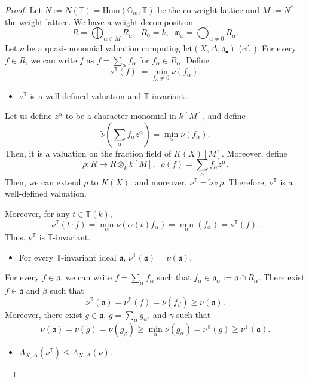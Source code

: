 \documentclass[a4paper,12pt]{amsart}
\theoremstyle{definition} %
\theoremstyle{remark}
\numberwithin{equation}{section}
\begin{document}
\begin{proof}
Let $N:=N(\mathbb{T})=\mathrm{Hom}(\mathbb{G}_m,\mathbb{T})$ be the co-weight lattice and $M:=N^*$ the weight lattice. We have a weight decomposition
$$ R=\bigoplus_{\alpha\in M}R_{\alpha}, \,\,\,R_0=k,\,\,\, \mathfrak{m}_x=\bigoplus_{\alpha \ne 0}R_{\alpha}.$$
Let $\nu$ be a quasi-monomial valuation computing $\mathrm{lct}(X,\Delta,\mathfrak{a}_{\bullet})$ (cf. \cite[Theorem 1.1]{Xu20}). For every $f\in R$, we can write $f$ as $f=\sum_{\alpha} f_{\alpha}$ for $f_{\alpha}\in R_{\alpha}$. Define
$$ \nu^{\mathbb{T}}(f):=\min_{f_{\alpha}\ne 0}\nu(f_{\alpha}).$$
\begin{itemize}
    \item[(1)] $\nu^{\mathbb{T}}$ is a well-defined valuation and $\mathbb{T}$-invariant.
\end{itemize}
Let us define $z^{\alpha}$ to be a character monomial in $k[M]$, and define
$$ \tilde{\nu}\left(\sum_{\alpha}f_{\alpha}z^{\alpha}\right)=\min_{\alpha}\nu(f_{\alpha}).$$
Then, it is a valuation on the fraction field of $K(X)[M]$. Moreover, define
$$ \rho:R\to R\otimes_k k[M], \,\,\, \rho(f)=\sum_{\alpha}f_{\alpha}z^{\alpha}. $$
Then, we can extend $\rho$ to $K(X)$, and moreover, $\nu^{\mathbb{T}}=\tilde{\nu}\circ \rho$. Therefore, $\nu^{\mathbb{T}}$ is a well-defined valuation.

\smallskip

Moreover, for any $t\in \mathbb{T}(k)$,
$$ \nu^{\mathbb{T}}(t\cdot f)=\min_{\alpha}\nu(\alpha(t)f_{\alpha})=\min_{\alpha}(f_{\alpha})=\nu^{\mathbb{T}}(f).$$
Thus, $\nu^{\mathbb{T}}$ is $\mathbb{T}$-invariant.

\begin{itemize}
    \item[(2)] For every $\mathbb{T}$-invariant ideal $\mathfrak{a}$, $\nu^{\mathbb{T}}(\mathfrak{a})=\nu(\mathfrak{a})$.
\end{itemize}

For every $f\in \mathfrak{a}$, we can write $f=\sum_{\alpha}f_{\alpha}$ such that $f_{\alpha}\in \mathfrak{a}_{\alpha}:=\mathfrak{a}\cap R_{\alpha}$. There exist $f\in \mathfrak{a}$ and $\beta$ such that 
$$\nu^{\mathbb{T}}(\mathfrak{a})=\nu^{\mathbb{T}}(f)=\nu(f_{\beta})\ge \nu(\mathfrak{a}).$$
Moreover, there exist $g\in \mathfrak{a}$, $g=\sum_{\alpha}g_{\alpha}$, and $\gamma$ such that
$$ \nu(\mathfrak{a})=\nu(g)=\nu(g_{\beta})\ge \min_{\alpha}\nu(g_{\alpha})=\nu^{\mathbb{T}}(g)\ge \nu^{\mathbb{T}}(\mathfrak{a}).$$

\begin{itemize}
    \item[(3)] $A_{X,\Delta}(\nu^{\mathbb{T}})\le A_{X,\Delta}(\nu)$.
\end{itemize}


\end{proof}
\end{document}
